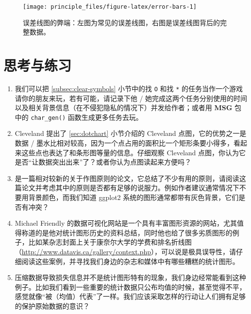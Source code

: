 \documentclass[
  b5paper,
  UTF8,twoside]{book}
\begin{document}
\begin{figure}

{\centering \texttt{[image: principle\_files/figure-latex/error-bars-1]} 

}

\caption[ 误差线图的弊端 ]{误差线图的弊端：左图为常见的误差线图，右图是误差线图背后的完整数据。}\label{fig:error-bars}
\end{figure}



\section{思考与练习}\label{ux601dux8003ux4e0eux7ec3ux4e60-6}

\begin{enumerate}
\def\labelenumi{\arabic{enumi}.}
\item
  我们可以把 \ref{subsec:clear-symbols} 小节中的找 \texttt{O} 和找 \texttt{*} 的任务当作一个游戏请你的朋友来玩，若有可能，请记录下他 / 她完成这两个任务分别使用的时间以及相关背景信息（在不侵犯隐私的情况下）并发给作者；或者用 \textbf{MSG} 包中的 \texttt{char\_gen()} 函数生成更多任务去玩。
\item
  Cleveland 提出了 \ref{sec:dotchart} 小节介绍的 Cleveland 点图，它的优势之一是数据 / 墨水比相对较高，因为一个点占用的面积比一个矩形条要小得多，看起来这些点也表达了和条形图等量的信息。仔细观察 Cleveland 点图，你认为它是否``让数据突出出来''了？或者你认为点图读起来方便吗？
\item
  \citet{Lane09} 是一篇相对较新的关于作图原则的论文，它总结了不少有用的原则，请阅读这篇论文并考虑其中的原则是否都有足够的说服力。例如作者建议通常情况下不要用背景颜色，而我们知道 ggplot2 系统的图形通常都带有灰色背景，它们是否有冲突？
\item
  Michael Friendly 的数据可视化网站是一个具有丰富图形资源的网站，尤其值得称道的是他对统计图形历史的资料总结，同时他也给了很多劣质图形的例子，比如某杂志封面上关于康奈尔大学的学费和排名折线图（\url{http://www.datavis.ca/gallery/context.php}），可以说是极具误导性，请仔细阅读这些案例，并寻找我们身边的杂志和媒体中有哪些糟糕的统计图形。
\item
  压缩数据导致损失信息并不是统计图形特有的现象，我们身边经常能看到这种例子。比如我们看到一些重要的统计数据只公布均值的时候，甚至觉得不平，感觉就像``被（均值）代表''了一样。我们应该采取怎样的行动让人们拥有足够的保护原始数据的意识？
\end{enumerate}

\cleardoublepage
\end{document}
